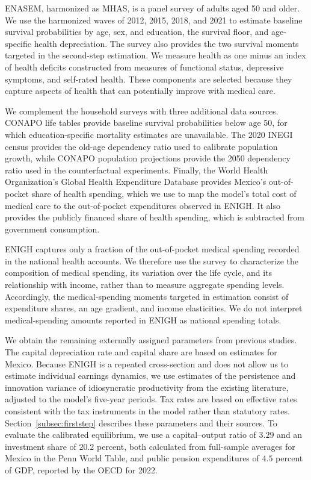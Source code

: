 \documentclass[12pt,a4paper]{article}
\begin{document}
ENASEM, harmonized as MHAS, is a panel survey of adults aged 50 and older. We use the harmonized waves of 2012, 2015, 2018, and 2021 to estimate baseline survival probabilities by age, sex, and education, the survival floor, and age-specific health depreciation. The survey also provides the two survival moments targeted in the second-step estimation. We measure health as one minus an index of health deficits constructed from measures of functional status, depressive symptoms, and self-rated health. These components are selected because they capture aspects of health that can potentially improve with medical care.

We complement the household surveys with three additional data sources. CONAPO life tables provide baseline survival probabilities below age 50, for which education-specific mortality estimates are unavailable. The 2020 INEGI census provides the old-age dependency ratio used to calibrate population growth, while CONAPO population projections provide the 2050 dependency ratio used in the counterfactual experiments. Finally, the World Health Organization's Global Health Expenditure Database provides Mexico's out-of-pocket share of health spending, which we use to map the model's total cost of medical care to the out-of-pocket expenditures observed in ENIGH. It also provides the publicly financed share of health spending, which is subtracted from government consumption.

ENIGH captures only a fraction of the out-of-pocket medical spending recorded in the national health accounts. We therefore use the survey to characterize the composition of medical spending, its variation over the life cycle, and its relationship with income, rather than to measure aggregate spending levels. Accordingly, the medical-spending moments targeted in estimation consist of expenditure shares, an age gradient, and income elasticities. We do not interpret medical-spending amounts reported in ENIGH as national spending totals.

We obtain the remaining externally assigned parameters from previous studies. The capital depreciation rate and capital share are based on estimates for Mexico. Because ENIGH is a repeated cross-section and does not allow us to estimate individual earnings dynamics, we use estimates of the persistence and innovation variance of idiosyncratic productivity from the existing literature, adjusted to the model's five-year periods. Tax rates are based on effective rates consistent with the tax instruments in the model rather than statutory rates. Section~\ref{subsec:firststep} describes these parameters and their sources. To evaluate the calibrated equilibrium, we use a capital--output ratio of $3.29$ and an investment share of $20.2$ percent, both calculated from full-sample averages for Mexico in the Penn World Table, and public pension expenditures of $4.5$ percent of GDP, reported by the OECD for 2022.
\end{document}
